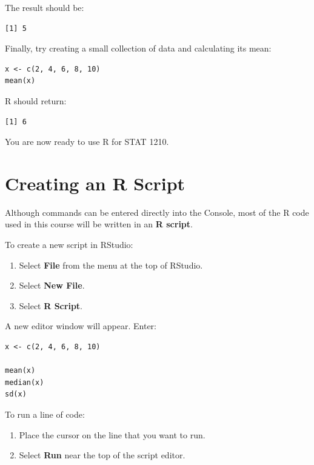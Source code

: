 \documentclass[11pt]{article}
\begin{document}
The result should be:

\begin{lstlisting}
[1] 5
\end{lstlisting}

Finally, try creating a small collection of data and calculating its mean:

\begin{lstlisting}
x <- c(2, 4, 6, 8, 10)
mean(x)
\end{lstlisting}

R should return:

\begin{lstlisting}
[1] 6
\end{lstlisting}

You are now ready to use R for STAT 1210.


\section{Creating an R Script}
Although commands can be entered directly into the Console, most of the R code used in this course will be written in an \textbf{R script}.

To create a new script in RStudio:

\begin{enumerate}
    \item Select \textbf{File} from the menu at the top of RStudio.
    \item Select \textbf{New File}.
    \item Select \textbf{R Script}.

\end{enumerate}

A new editor window will appear. Enter:

\begin{lstlisting}
x <- c(2, 4, 6, 8, 10)

mean(x)
median(x)
sd(x)
\end{lstlisting}

To run a line of code:

\begin{enumerate}
    \item Place the cursor on the line that you want to run.
    \item Select \textbf{Run} near the top of the script editor.
\end{enumerate}
\end{document}
